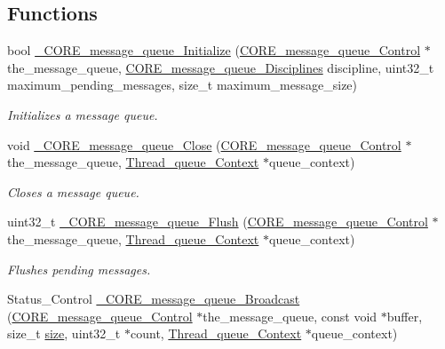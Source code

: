 \subsection*{Functions}
\begin{DoxyCompactItemize}
\item 
bool \mbox{\hyperlink{group__RTEMSScoreMessageQueue_ga5358dca7fe0334940c9bfed58b4e520a}{\+\_\+\+C\+O\+R\+E\+\_\+message\+\_\+queue\+\_\+\+Initialize}} (\mbox{\hyperlink{structCORE__message__queue__Control}{C\+O\+R\+E\+\_\+message\+\_\+queue\+\_\+\+Control}} $\ast$the\+\_\+message\+\_\+queue, \mbox{\hyperlink{group__RTEMSScoreMessageQueue_gaaeca88271cd9bc9ed7cf6996915481d0}{C\+O\+R\+E\+\_\+message\+\_\+queue\+\_\+\+Disciplines}} discipline, uint32\+\_\+t maximum\+\_\+pending\+\_\+messages, size\+\_\+t maximum\+\_\+message\+\_\+size)
\begin{DoxyCompactList}\small\item\em Initializes a message queue. \end{DoxyCompactList}\item 
void \mbox{\hyperlink{group__RTEMSScoreMessageQueue_ga98d64cbe51135fb2e313644c1158a1f7}{\+\_\+\+C\+O\+R\+E\+\_\+message\+\_\+queue\+\_\+\+Close}} (\mbox{\hyperlink{structCORE__message__queue__Control}{C\+O\+R\+E\+\_\+message\+\_\+queue\+\_\+\+Control}} $\ast$the\+\_\+message\+\_\+queue, \mbox{\hyperlink{structThread__queue__Context}{Thread\+\_\+queue\+\_\+\+Context}} $\ast$queue\+\_\+context)
\begin{DoxyCompactList}\small\item\em Closes a message queue. \end{DoxyCompactList}\item 
uint32\+\_\+t \mbox{\hyperlink{group__RTEMSScoreMessageQueue_gabe86da1ead8e6b01ecf69c94e1de29f2}{\+\_\+\+C\+O\+R\+E\+\_\+message\+\_\+queue\+\_\+\+Flush}} (\mbox{\hyperlink{structCORE__message__queue__Control}{C\+O\+R\+E\+\_\+message\+\_\+queue\+\_\+\+Control}} $\ast$the\+\_\+message\+\_\+queue, \mbox{\hyperlink{structThread__queue__Context}{Thread\+\_\+queue\+\_\+\+Context}} $\ast$queue\+\_\+context)
\begin{DoxyCompactList}\small\item\em Flushes pending messages. \end{DoxyCompactList}\item 
Status\+\_\+\+Control \mbox{\hyperlink{group__RTEMSScoreMessageQueue_gac2f24b796e0bfb124ab4e246ed476f5b}{\+\_\+\+C\+O\+R\+E\+\_\+message\+\_\+queue\+\_\+\+Broadcast}} (\mbox{\hyperlink{structCORE__message__queue__Control}{C\+O\+R\+E\+\_\+message\+\_\+queue\+\_\+\+Control}} $\ast$the\+\_\+message\+\_\+queue, const void $\ast$buffer, size\+\_\+t \mbox{\hyperlink{sun4u_2tte_8h_a245260f6f74972558f61b85227df5aae}{size}}, uint32\+\_\+t $\ast$count, \mbox{\hyperlink{structThread__queue__Context}{Thread\+\_\+queue\+\_\+\+Context}} $\ast$queue\+\_\+context)

\end{DoxyCompactItemize}
